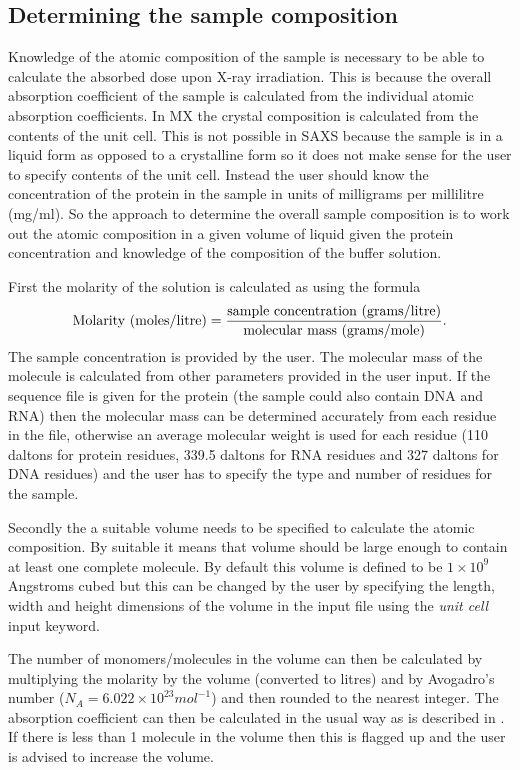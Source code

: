 \subsection{Determining the sample composition}
\label{sub:Determining the sample composition}
Knowledge of the atomic composition of the sample is necessary to be able to calculate the absorbed dose upon X-ray irradiation.
This is because the overall absorption coefficient of the sample is calculated from the individual atomic absorption coefficients.
In MX the crystal composition is calculated from the contents of the unit cell.
This is not possible in SAXS because the sample is in a liquid form as opposed to a crystalline form so it does not make sense for the user to specify contents of the unit cell.
Instead the user should know the concentration of the protein in the sample in units of milligrams per millilitre (mg/ml).
So the approach to determine the overall sample composition is to work out the atomic composition in a given volume of liquid given the protein concentration and knowledge of the composition of the buffer solution.

First the molarity of the solution is calculated as using the formula
\begin{equation}
    \text{Molarity (moles/litre)} = \frac{\text{sample concentration (grams/litre)}}{\text{molecular mass (grams/mole)}}.
    \label{eq:molarity calculation}
\end{equation}
The sample concentration is provided by the user. The molecular mass of the molecule is calculated from other parameters provided in the user input. If the sequence file is given for the protein (the sample could also contain DNA and RNA) then the molecular mass can be determined accurately from each residue in the file, otherwise an average molecular weight is used for each residue (110 daltons for protein residues, 339.5 daltons for RNA residues and 327 daltons for DNA residues) and the user has to specify the type and number of residues for the sample.

Secondly the a suitable volume needs to be specified to calculate the atomic composition. By suitable it means that volume should be large enough to contain at least one complete molecule.
By default this volume is defined to be $1 \times 10^9$ Angstroms cubed but this can be changed by the user by specifying the length, width and height dimensions of the volume in the input file using the \textit{unit cell} input keyword.

The number of monomers/molecules in the volume can then be calculated by multiplying the molarity by the volume (converted to litres) and by Avogadro's number ($N_A = 6.022 \times 10^{23} mol^{−1}$) and then rounded to the nearest integer.
The absorption coefficient can then be calculated in the usual way as is described in \cite{pait2009}.
If there is less than 1 molecule in the volume then this is flagged up and the user is advised to increase the volume.

